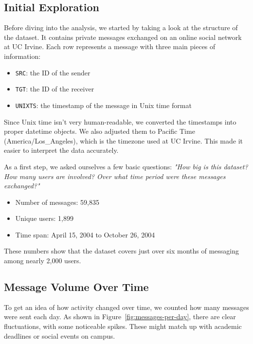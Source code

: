 \subsection{Initial Exploration}

Before diving into the analysis, we started by taking a look at the structure of the dataset. It contains private messages exchanged on an online social network at UC Irvine. Each row represents a message with three main pieces of information:

\begin{itemize}\setlength{\itemsep}{0pt}
    \item \texttt{SRC}: the ID of the sender
    \item \texttt{TGT}: the ID of the receiver
    \item \texttt{UNIXTS}: the timestamp of the message in Unix time format
\end{itemize}

Since Unix time isn't very human-readable, we converted the timestamps into proper datetime objects. We also adjusted them to Pacific Time (America/Los\_Angeles), which is the timezone used at UC Irvine. This made it easier to interpret the data accurately.

As a first step, we asked ourselves a few basic questions: \textit{"How big is this dataset? How many users are involved? Over what time period were these messages exchanged?"}

\begin{itemize}\setlength{\itemsep}{0pt}
    \item Number of messages: 59,835
    \item Unique users: 1,899
    \item Time span: April 15, 2004 to October 26, 2004
\end{itemize}

These numbers show that the dataset covers just over six months of messaging among nearly 2,000 users.

\subsection{Message Volume Over Time}

To get an idea of how activity changed over time, we counted how many messages were sent each day. As shown in Figure~\ref{fig:messages-per-day}, there are clear fluctuations, with some noticeable spikes. These might match up with academic deadlines or social events on campus.

